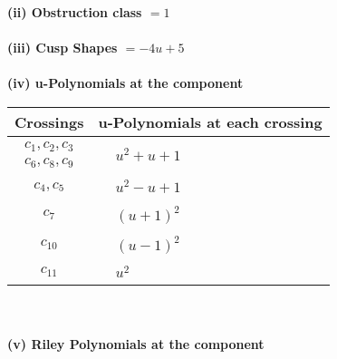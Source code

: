 \documentclass[1p]{elsarticle_modified}
\theoremstyle{definition}
\begin{document}
\flushleft \textbf{(ii) Obstruction class $= 1$}\\~\\
\flushleft \textbf{(iii) Cusp Shapes $= -4 u+5$}\\~\\
\newpage\renewcommand{\arraystretch}{1}
\flushleft \textbf{(iv) u-Polynomials at the component}\newline \\
\begin{tabular}{m{50pt}|m{274pt}}
Crossings & \hspace{64pt}u-Polynomials at each crossing \\
\hline $$\begin{aligned}c_{1},c_{2},c_{3}\\c_{6},c_{8},c_{9}\end{aligned}$$&$\begin{aligned}
&u^2+u+1
\end{aligned}$\\
\hline $$\begin{aligned}c_{4},c_{5}\end{aligned}$$&$\begin{aligned}
&u^2- u+1
\end{aligned}$\\
\hline $$\begin{aligned}c_{7}\end{aligned}$$&$\begin{aligned}
&(u+1)^2
\end{aligned}$\\
\hline $$\begin{aligned}c_{10}\end{aligned}$$&$\begin{aligned}
&(u-1)^2
\end{aligned}$\\
\hline $$\begin{aligned}c_{11}\end{aligned}$$&$\begin{aligned}
&u^2
\end{aligned}$\\
\hline
\end{tabular}\\~\\
\newpage\renewcommand{\arraystretch}{1}
\flushleft \textbf{(v) Riley Polynomials at the component}\newline \\
\end{document}
